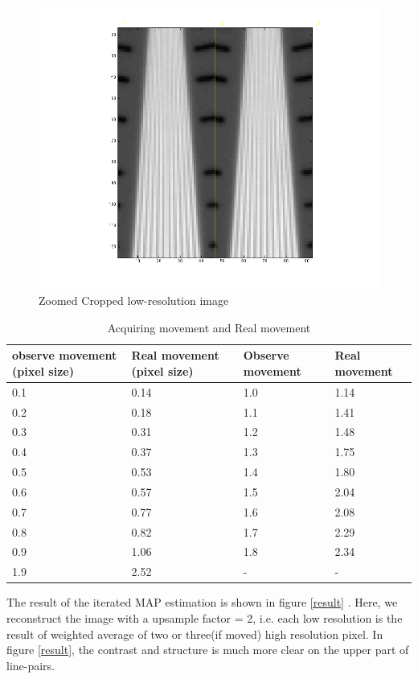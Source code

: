 \documentclass{article}
\begin{document}
\begin{figure}[H]
\centering
\includegraphics[width = 1\textwidth]{data_magnified}
\caption{Zoomed Cropped low-resolution image } \label{zoom}
\end{figure}

\begin{table}[h!]
\centering
\begin{tabular}{ | m{2cm}| m{2cm} | m{2cm} | m{2cm} |} 
\hline
 observe movement (pixel size)&  Real movement (pixel size)& Observe movement & Real movement \\ 
\hline
 0.1 & 0.14 & 1.0 & 1.14 \\ 
\hline
0.2 & 0.18 & 1.1 &  1.41\\ 
\hline
0.3 & 0.31& 1.2  & 1.48  \\ 
\hline
0.4 & 0.37&  1.3 &  1.75\\ 
\hline
0.5 & 0.53&  1.4 &  1.80\\ 
\hline
0.6 & 0.57& 1.5 & 2.04  \\ 
\hline
0.7 & 0.77& 1.6 & 2.08 \\ 
\hline
0.8 & 0.82&  1.7 & 2.29 \\ 
\hline
0.9 & 1.06&  1.8 &  2.34 \\ 
\hline
1.9 & 2.52&  - &  - \\ 
\hline
\end{tabular}
\caption{Acquiring movement and Real movement}
\label{table1}
\end{table}

The result of the iterated MAP estimation is shown in figure \ref{result} . Here, we reconstruct the image with a upsample factor = 2, i.e. each low resolution is the result of weighted average of two or three(if moved) high resolution pixel. In figure \ref{result}, the contrast and structure is much more clear on the upper part of line-pairs.
\end{document}
